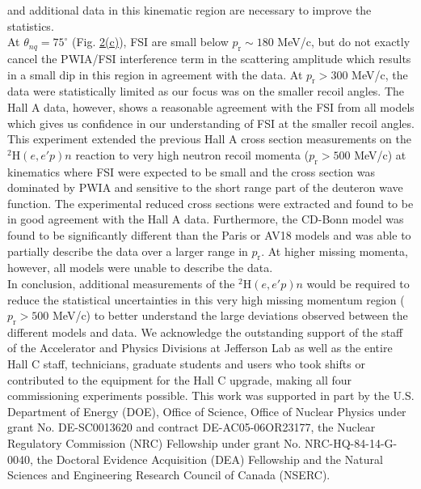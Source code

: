 and additional data in this kinematic region are necessary to improve the statistics. \\
\indent At $\theta_{nq}=75^{\circ}$ (Fig. \hyperref[fig:fig2]{2(c)}), FSI are small below $p_{\mathrm{r}}\sim180$ MeV/c, but do not exactly cancel the PWIA/FSI interference term in the scattering amplitude which results in a small dip in this region in agreement with the data.
At $p_{\mathrm{r}}>300$ MeV/c, the data were statistically limited as our focus was on the smaller recoil angles. The Hall A data, however, shows a reasonable agreement with the FSI from all models which gives us confidence in our understanding
of FSI at the smaller recoil angles. \\
\indent This experiment extended the previous Hall A cross section measurements on the $^{2}\mathrm{H}(e,e'p)n$ reaction to 
very high neutron recoil momenta ($p_{\mathrm{r}}>500$ MeV/c) at kinematics where FSI were expected to be small and the cross section was dominated by PWIA and sensitive to the
short range part of the deuteron wave function. The experimental reduced cross sections were extracted and found to be in good agreement with the Hall A data.
Furthermore, the CD-Bonn model was found to be significantly different than the Paris or AV18 models and was able to partially describe the data over a larger range in $p_{\mathrm{r}}$.
At higher missing momenta, however, all models were unable to describe the data. \\
\indent In conclusion, additional measurements of the $^{2}\mathrm{H}(e,e'p)n$ would be required to reduce the statistical uncertainties in this very high missing
momentum region ($p_{\mathrm{r}}>500$ MeV/c) to better understand the large deviations observed between the different models and data.
\indent We acknowledge the outstanding support of the staff of the Accelerator and Physics Divisions at Jefferson Lab
as well as the entire Hall C staff, technicians, graduate students and users who took shifts or contributed
to the equipment for the Hall C upgrade, making all four commissioning experiments possible. This work
was supported in part by the U.S. Department of Energy (DOE), Office of Science, Office of Nuclear Physics
under grant No. DE-SC0013620 and contract DE-AC05-06OR23177, the Nuclear Regulatory Commission (NRC) Fellowship
under grant No. NRC-HQ-84-14-G-0040, the Doctoral Evidence Acquisition (DEA) Fellowship and the Natural Sciences and Engineering Research Council of Canada (NSERC).

